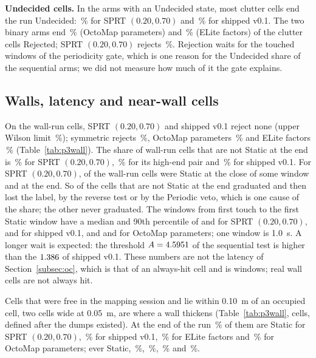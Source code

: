 \noindent\textbf{Undecided cells.} In the arms with an Undecided state, most clutter cells end the run Undecided: \PtLilUndSprt\,\% for SPRT $(0.20,0.70)$ and \PtLilUndShipped\,\% for shipped v0.1. The two binary arms end \PtLilRejOcto\,\% (OctoMap parameters) and \PtLilRejElite\,\% (ELite factors) of the clutter cells Rejected; SPRT $(0.20,0.70)$ rejects \PtLilRejSprt\,\%. Rejection waits for the touched windows of the periodicity gate, which is one reason for the Undecided share of the sequential arms; we did not measure how much of it the gate explains.

\subsection{Walls, latency and near-wall cells}\label{subsec:p3walls}



On the \PtWallN{} wall-run cells, SPRT $(0.20,0.70)$ and shipped v0.1 reject none (upper Wilson limit \PtWallRejHi\,\%); symmetric rejects \PtWallRejSymm\,\%, OctoMap parameters \PtWallRejOcto\,\% and ELite factors \PtWallRejElite\,\% (Table~\ref{tab:p3wall}). The share of wall-run cells that are not Static at the end is \PtWallNotSprt\,\% for SPRT $(0.20,0.70)$, \PtWallNotHigh\,\% for its high-end pair and \PtWallNotShipped\,\% for shipped v0.1. For SPRT $(0.20,0.70)$, \PtWallEverSprt{} of the \PtWallN{} wall-run cells were Static at the close of some window and \PtWallEndSprt{} at the end. So \PtWallLostSprt{} of the \PtWallNotKSprt{} cells that are not Static at the end graduated and then lost the label, by the reverse test or by the Periodic veto, which is one cause of the share; the other \PtWallNeverSprt{} never graduated. The windows from first touch to the first Static window have a median and 90th percentile of \PtWallMedSprt{} and \PtWallNinetySprt{} for SPRT $(0.20,0.70)$, \PtWallMedShipped{} and \PtWallNinetyShipped{} for shipped v0.1, and \PtWallMedOcto{} and \PtWallNinetyOcto{} for OctoMap parameters; one window is 1.0~s. A longer wait is expected: the threshold $A=4.5951$ of the sequential test is higher than the $1.386$ of shipped v0.1. These numbers are not the latency of Section~\ref{subsec:oc}, which is that of an always-hit cell and is \SqLatency{} windows; real wall cells are not always hit.

Cells that were free in the mapping session and lie within 0.10~m of an occupied cell, two cells wide at 0.05~m, are where a wall thickens (Table~\ref{tab:p3wall}, \PtNearN{} cells, defined after the dumps existed). At the end of the run \PtNearEndSprt\,\% of them are Static for SPRT $(0.20,0.70)$, \PtNearEndShipped\,\% for shipped v0.1, \PtNearEndElite\,\% for ELite factors and \PtNearEndOcto\,\% for OctoMap parameters; ever Static, \PtNearEverSprt\,\%, \PtNearEverShipped\,\%, \PtNearEverElite\,\% and \PtNearEverOcto\,\%.

